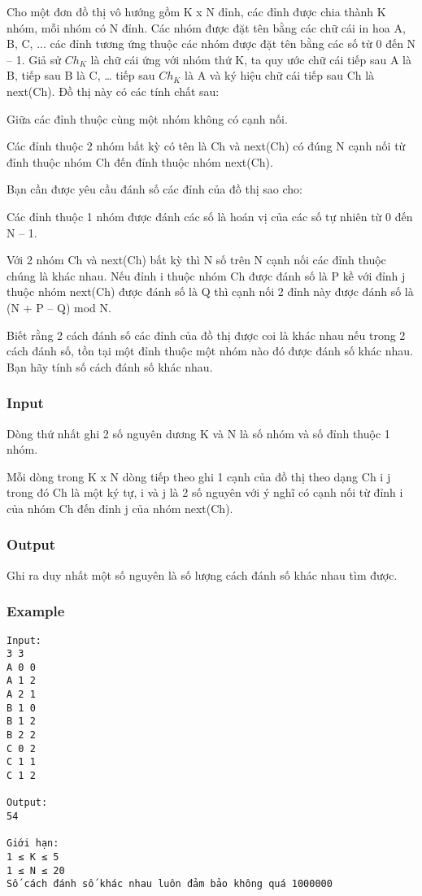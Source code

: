 



   Cho một đơn đồ thị vô hướng gồm K x N đỉnh, các đỉnh được chia thành K nhóm, mỗi nhóm có N đỉnh. Các nhóm được đặt tên bằng các chữ cái in hoa A, B, C, ... các đỉnh tương ứng thuộc các nhóm được đặt tên bằng các số từ 0 đến N – 1. Giả sử $Ch_{K}$   là chữ cái ứng với nhóm thứ K, ta quy ước chữ cái tiếp sau A là B, tiếp sau B là C, … tiếp sau $Ch_{K}$   là A và ký hiệu chữ cái tiếp sau Ch là next(Ch). Đồ thị này có các tính chất sau:  

   Giữa các đỉnh thuộc cùng một nhóm không có cạnh nối.  

   Các đỉnh thuộc 2 nhóm bất kỳ có tên là Ch và next(Ch) có đúng N cạnh nối từ đỉnh thuộc nhóm Ch đến đỉnh thuộc nhóm next(Ch).  

   Bạn cần được yêu cầu đánh số các đỉnh của đồ thị sao cho:  

   Các đỉnh thuộc 1 nhóm được đánh các số là hoán vị của các số tự nhiên từ 0 đến N – 1.  

   Với 2 nhóm Ch và next(Ch) bất kỳ thì N số trên N cạnh nối các đỉnh thuộc chúng là khác nhau. Nếu đỉnh i thuộc nhóm Ch được đánh số là P kề với đỉnh j thuộc nhóm next(Ch) được đánh số là Q thì cạnh nối 2 đỉnh này được đánh số là (N + P – Q) mod N.  

   Biết rằng 2 cách đánh số các đỉnh của đồ thị được coi là khác nhau nếu trong 2 cách đánh số, tồn tại một đỉnh thuộc một nhóm nào đó được đánh số khác nhau. Bạn hãy tính số cách đánh số khác nhau.  

\subsubsection{   Input  }

   Dòng thứ nhất ghi 2 số nguyên dương K và N là số nhóm và số đỉnh thuộc 1 nhóm.  

   Mỗi dòng trong K x N dòng tiếp theo ghi 1 cạnh của đồ thị theo dạng Ch i j trong đó Ch là một ký tự, i và j là 2 số nguyên với ý nghĩ có cạnh nối từ đỉnh i của nhóm Ch đến đỉnh j của nhóm next(Ch).  

\subsubsection{   Output  }

   Ghi ra duy nhất một số nguyên là số lượng cách đánh số khác nhau tìm được.  

\subsubsection{   Example  }
\begin{verbatim}
Input:
3 3
A 0 0
A 1 2
A 2 1
B 1 0
B 1 2
B 2 2
C 0 2
C 1 1
C 1 2

Output:
54

Giới hạn:
1 ≤ K ≤ 5
1 ≤ N ≤ 20
Số cách đánh số khác nhau luôn đảm bảo không quá 1000000

\end{verbatim}
